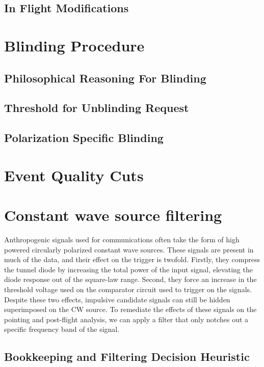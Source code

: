 	\subsection{In Flight Modifications}
	
\section{Blinding Procedure}

	\subsection{Philosophical Reasoning For Blinding}
	
	\subsection{Threshold for Unblinding Request}

	\subsection{Polarization Specific Blinding}

\section{Event Quality Cuts}

\section{Constant wave source filtering}
	Anthropogenic signals used for communications often take the form of high powered circularly polarized constant wave sources.  These signals are present in much of the data, and their effect on the trigger is twofold.  Firstly, they compress the tunnel diode by increasing the total power of the input signal, elevating the diode response out of the square-law range.  Second, they force an increase in the threshold voltage used on the comparator circuit used to trigger on the signals.  Despite these two effects, impulsive candidate signals can still be hidden superimposed on the CW source.  To remediate the effects of these signals on the pointing and post-flight analysis, we can apply a filter that only notches out a specific frequency band of the signal.
	\subsection{Bookkeeping and Filtering Decision Heuristic}
